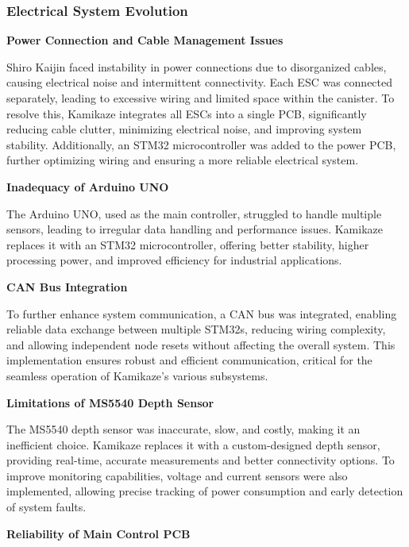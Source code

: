 \subsubsection{Electrical System Evolution}

\textbf{Power Connection and Cable Management Issues}

Shiro Kaijin faced instability in power connections due to disorganized cables, causing electrical noise and intermittent connectivity. Each ESC was connected separately, leading to excessive wiring and limited space within the canister. To resolve this, Kamikaze integrates all ESCs into a single PCB, significantly reducing cable clutter, minimizing electrical noise, and improving system stability. Additionally, an STM32 microcontroller was added to the power PCB, further optimizing wiring and ensuring a more reliable electrical system.

\vspace{0.2cm}
\textbf{Inadequacy of Arduino UNO}

The Arduino UNO, used as the main controller, struggled to handle multiple sensors, leading to irregular data handling and performance issues. Kamikaze replaces it with an STM32 microcontroller, offering better stability, higher processing power, and improved efficiency for industrial applications. 

\vspace{0.2cm}
\textbf{CAN Bus Integration}

To further enhance system communication, a CAN bus was integrated, enabling reliable data exchange between multiple STM32s, reducing wiring complexity, and allowing independent node resets without affecting the overall system. This implementation ensures robust and efficient communication, critical for the seamless operation of Kamikaze's various subsystems.

\vspace{0.2cm}
\textbf{Limitations of MS5540 Depth Sensor}

The MS5540 depth sensor was inaccurate, slow, and costly, making it an inefficient choice. Kamikaze replaces it with a custom-designed depth sensor, providing real-time, accurate measurements and better connectivity options. To improve monitoring capabilities, voltage and current sensors were also implemented, allowing precise tracking of power consumption and early detection of system faults.

\vspace{0.2cm}
\textbf{Reliability of Main Control PCB}

